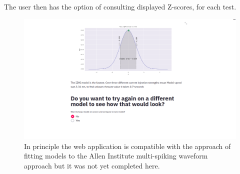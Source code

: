 The user then has the option of consulting displayed Z-scores, for each test.
\begin{figure}[h!]
\includegraphics[]{chapters/app_tex/Screenshot from 2020-09-19 10-47-27}
\caption{In principle the web application is compatible with the approach of fitting models to the Allen Institute multi-spiking waveform approach but it was not yet completed here.}
\end{figure}



